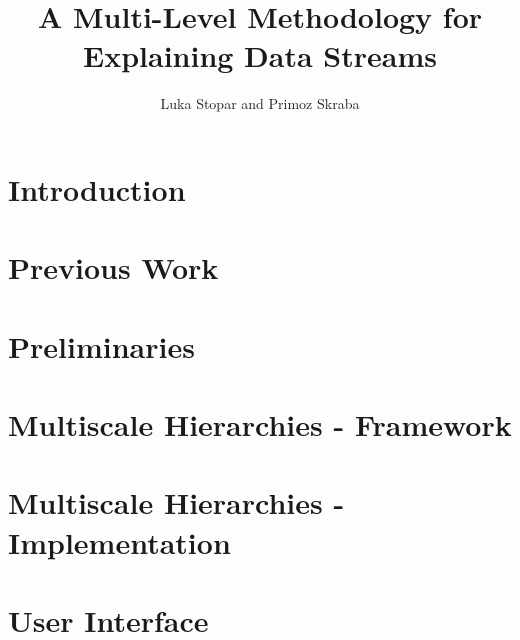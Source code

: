 \documentclass[journal]{vgtc}                %
\title{A Multi-Level Methodology for Explaining Data Streams}
\author{Luka Stopar and Primoz Skraba}
\begin{document}

\maketitle

\section{Introduction}
\label{sec:introduction}





\section{Previous Work}
\label{sec:previous}


\section{Preliminaries}
\label{sec:preliminaries}


\section{Multiscale Hierarchies - Framework}
\label{sec:multiscale-framework}



\section{Multiscale Hierarchies - Implementation}
\label{sec:multiscale-implementation}


\section{User Interface}
\label{sec:ui}

\end{document}
